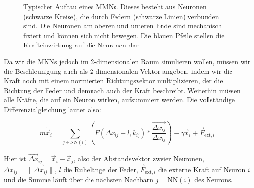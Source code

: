 \begin{figure}[htbp!]
    \centering
    \caption{Typischer Aufbau eines MMNs. Dieses besteht aus Neuronen (schwarze Kreise), die durch Federn (schwarze Linien) verbunden sind. Die Neuronen am oberen und unteren Ende sind mechanisch fixiert und können sich nicht bewegen.
    Die blauen Pfeile stellen die Krafteinwirkung auf die Neuronen dar.
    }
    \label{fig:positive_springs}
\end{figure}

Da wir die MNNs jedoch im 2-dimensionalen Raum simulieren wollen, müssen wir die Beschleunigung auch als 2-dimensionalen Vektor angeben, indem wir die Kraft noch mit einem normierten Richtungsvektor multiplizieren, der die Richtung der Feder und demnach auch der Kraft beschreibt. 
Weiterhin müssen alle Kräfte, die auf ein Neuron wirken, aufsummiert werden.
Die vollständige Differenzialgleichung lautet also:

{\[
    m \ddot{\vec{x}}_{i} = \sum_{j \in \textrm{NN}(i)} \left( F\left(\Delta x_{ij} - l, k_{ij}\right)
     * \frac{\vec{\Delta x_{ij}}}{ \Delta x_{ij}} \right)
     - \gamma \dot{\vec{x}}_i + \vec{F}_{\textrm{ext}, i}
\]}

Hier ist $ \vec{\Delta x}_{ij} = \vec{x}_i - \vec{x}_j$, also der Abstandsvektor zweier Neuronen,
$\Delta x_{ij}= \| \vec{\Delta x}_{ij} \|$, $l$ die Ruhelänge der Feder, 
$\vec{F}_{\textrm{ext}, i}$ die externe Kraft auf Neuron $i$ und die Summe läuft über die nächsten Nachbarn $j = \textrm{NN}(i)$ des Neurons. 

